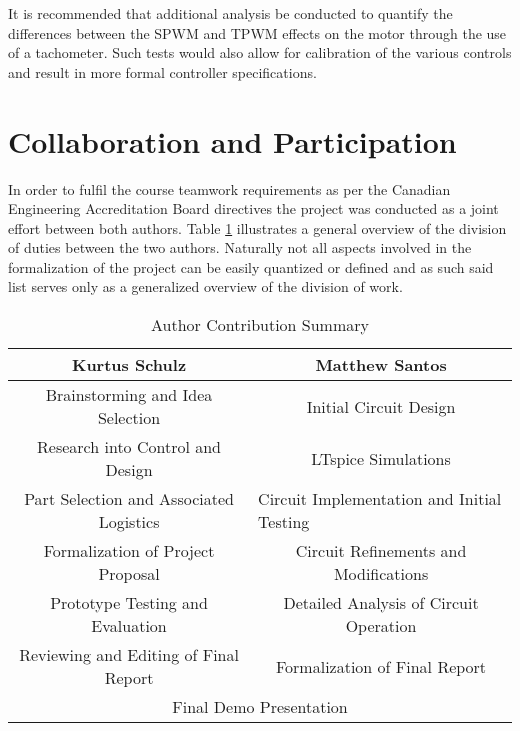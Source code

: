 \documentclass[12pt]{article}
\begin{document}
It is recommended that additional analysis be conducted to quantify the differences between the SPWM and TPWM effects on the motor through the use of a tachometer. Such tests would also allow for calibration of the various controls and result in more formal controller specifications.
\pagebreak
\section{Collaboration and Participation}%

In order to fulfil the course teamwork requirements as per the Canadian Engineering Accreditation Board directives the project was conducted as a joint effort between both authors. Table \ref{collaboration} illustrates a general overview of the division of duties between the two authors. Naturally not all aspects involved in the formalization of the project can be easily quantized or defined and as such said list serves only as a generalized overview of the division of work.

\begin{table}[H]
\centering
\caption{Author Contribution Summary}
\label{collaboration}
\begin{tabular}{|c|c|}
\hline
\textbf{Kurtus Schulz} & \textbf{Matthew Santos} \\ \hline
Brainstorming and Idea Selection & Initial Circuit Design \\ \hline
Research into Control and Design & LTspice Simulations \\ \hline
Part Selection and Associated Logistics & \multicolumn{1}{l|}{Circuit Implementation and Initial Testing} \\ \hline
Formalization of Project Proposal & Circuit Refinements and Modifications \\ \hline
Prototype Testing and Evaluation & Detailed Analysis of Circuit Operation \\ \hline
Reviewing and Editing of Final Report & Formalization of Final Report \\ \hline
\multicolumn{2}{|c|}{Final Demo Presentation} \\ \hline
\end{tabular}
\end{table}

\pagebreak
{}
\nocite{*}



\pagebreak

\end{document}

